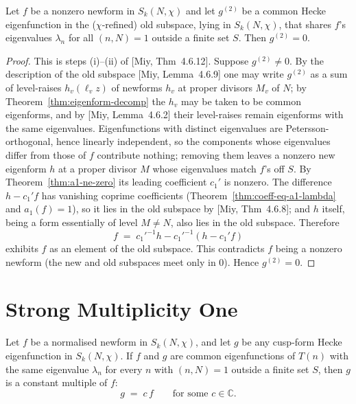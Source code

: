 \begin{theorem}\label{thm:oldPart-eq-zero}
\leanok
Let $f$ be a nonzero newform in $S_k(N,\chi)$ and let $g^{(2)}$ be a common Hecke eigenfunction in the
($\chi$-refined) old subspace, lying in $S_k(N,\chi)$, that shares $f$'s eigenvalues $\lambda_n$ for all
$(n,N)=1$ outside a finite set $S$. Then $g^{(2)}=0$.
\end{theorem}

\begin{proof}
\leanok
This is steps (i)--(ii) of [Miy, Thm~4.6.12]. Suppose $g^{(2)}\neq 0$. By the description of the old
subspace [Miy, Lemma~4.6.9] one may write $g^{(2)}$ as a sum of level-raises $h_v(\ell_v z)$ of newforms
$h_v$ at proper divisors $M_v$ of $N$; by Theorem~\ref{thm:eigenform-decomp} the $h_v$ may be taken to be
common eigenforms, and by [Miy, Lemma~4.6.2] their level-raises remain eigenforms with the same eigenvalues.
Eigenfunctions with distinct eigenvalues are Petersson-orthogonal, hence linearly independent, so the
components whose eigenvalues differ from those of $f$ contribute nothing; removing them leaves a nonzero
new eigenform $h$ at a proper divisor $M$ whose eigenvalues match $f$'s off $S$. By
Theorem~\ref{thm:a1-ne-zero} its leading coefficient $c_1'$ is nonzero. The difference $h-c_1'f$ has
vanishing coprime coefficients (Theorem~\ref{thm:coeff-eq-a1-lambda} and $a_1(f)=1$), so it lies in the old
subspace by [Miy, Thm~4.6.8]; and $h$ itself, being a form essentially of level $M\neq N$, also lies in the
old subspace. Therefore
\[
  f \;=\; c_1'^{-1}h - c_1'^{-1}(h-c_1'f)
\]
exhibits $f$ as an element of the old subspace. This contradicts $f$ being a nonzero newform (the new and
old subspaces meet only in $0$). Hence $g^{(2)}=0$.
\end{proof}

\section{Strong Multiplicity One}

\begin{theorem}\label{thm:smo-constMul}
\leanok
Let $f$ be a normalised newform in $S_k(N,\chi)$, and let $g$ be any cusp-form Hecke eigenfunction in
$S_k(N,\chi)$. If $f$ and $g$ are common eigenfunctions of $T(n)$ with the same eigenvalue $\lambda_n$ for
every $n$ with $(n,N)=1$ outside a finite set $S$, then $g$ is a constant multiple of $f$:
\[
  g \;=\; c\,f \qquad\text{for some } c\in\mathbb{C}.
\]
\end{theorem}

